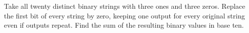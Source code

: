 Take all twenty distinct binary strings with three ones and three zeros. Replace the first bit of every string by zero, keeping one output for every original string even if outputs repeat. Find the sum of the resulting binary values in base ten.
